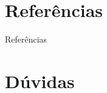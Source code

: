 \documentclass[%
    english,
    brazil]{ifsp-spo-beamer}
\begin{document}
\section{Referências}

\begin{frame}[allowframebreaks]{Referências}

\end{frame}

\section*{Dúvidas}

\newcommand{\urlApresentacao}{https://www.overleaf.com/project/606fb2f8be5c1d108ec8d237}
\end{document}
